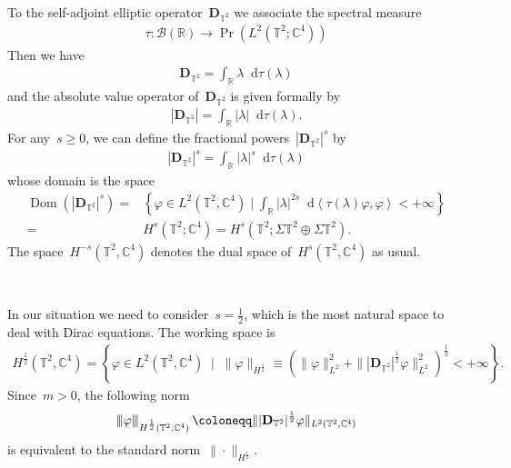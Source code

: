\documentclass[11pt,final]{amsart}
\newcommand{\tnorm}[1]{%
  \left\vert\kern-0.3ex\left\vert\kern-0.3ex\left\vert #1 \right\vert\kern-0.3ex\right\vert\kern-0.3ex\right\vert
}
\newcommand{\R}{\mathbb{R}}
\newcommand{\C}{\mathbb{C}}
\newcommand{\T}{\mathbb{T}}
\newcommand{\dd}{\mathop{}\!\mathrm{d}}
\newcommand{\pD}{\mathbf{D}}
\newcommand{\Abracket}[1]{\left<#1\right>} %
\newcommand{\parenthesis}[1]{\left(#1\right)} %
\newcommand{\braces}[1]{\left\{#1\right\}} %
\DeclareMathOperator{\Dom}{Dom}
\DeclareMathOperator{\proj}{Pr}
\begin{document}
To the self-adjoint elliptic operator~$\pD_{\T^2}$ we associate the spectral measure
\begin{align}
    \tau\colon \mathcal{B}(\R)\to \proj(L^2(\T^2;\C^4))
\end{align}
Then we have 
\begin{align}
    \pD_{\T^2} = \int_{\R} \lambda \dd\tau(\lambda)
\end{align}
and the absolute value operator of~$\pD_{\T^2}$ is given formally by 
\begin{align}
    |\pD_{\T^2}|=\int_\R |\lambda| \dd\tau(\lambda).
\end{align}
For any~$s\geq 0$, we can define the fractional powers~$|\pD_{\T^2}|^s$ by 
\begin{align}
    |\pD_{\T^2}|^s = \int_{\R} |\lambda|^s \dd\tau(\lambda)
\end{align}
whose domain is the space
\begin{align}
    \Dom(|\pD_{\T^2}|^s)
    =&\braces{ \varphi\in L^2(\T^2,\C^4) \mid \int_\R |\lambda|^{2s} \dd\Abracket{\tau(\lambda)\varphi,\varphi } <+\infty}  \\
    =&H^{s}(\mathbb{T}^2;\C^4) 
    =H^s(\T^2;\Sigma\T^2\oplus\Sigma\T^2).
\end{align}
The space~$H^{-s}(\T^2,\C^4)$ denotes the dual space of~$H^{s}(\T^2,\C^4)$ as usual. 

\ 

In our situation we need to consider~$s=\frac{1}{2}$, which is the most natural space to deal with Dirac equations. 
The working space is 
\begin{align}
    H^{\frac{1}{2}}(\T^2,\C^4)
    =\braces{\varphi\in L^2(\T^2,\C^4) \; \mid \; \|\varphi\|_{H^{\frac{1}{2}}} \equiv \parenthesis{ \|\varphi\|_{L^2}^2 + \| |\pD_{\T^2}|^{\frac{1}{2}} \varphi \|_{L^2}^2 }^{\frac{1}{2}} <+\infty  }. 
\end{align}
Since~$m>0$, the following norm 
\begin{align}
    \tnorm{\varphi}_{H^{\frac{1}{2}}(\T^2,\C^4)}\coloneqq \| |\pD_{\T^2}|^{\frac{1}{2}}\varphi\|_{L^2(\T^2,\C^4)}
\end{align}
is equivalent to the standard norm~$\|\cdot\|_{H^{\frac{1}{2}}}$. 
\end{document}

